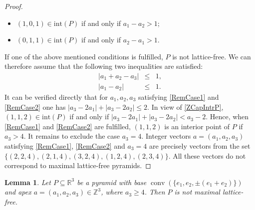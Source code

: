 \documentclass[a4paper]{article}
\theoremstyle{plain}
\newtheorem{lemma}[nn]{Lemma}
\begin{document}
\begin{proof}
\begin{itemize}
  \item $(1,0,1) \in {\mathrm{int}}(P)$ if and only if $a_1 - a_2 > 1$;
  \item $(0,1,1) \in {\mathrm{int}}(P)$ if and only if $a_2 - a_1 > 1.$ 
\end{itemize} 
If one of the above mentioned conditions is fulfilled, $P$
is not lattice-free.
We can therefore assume that the following two inequalities
are satisfied:
\begin{eqnarray}
  |a_1 + a_2 - a_3| & \le & 1, \label{RemCase1} \\
  |a_1 - a_2|       & \le & 1. \label{RemCase2}
\end{eqnarray}
It can be verified directly that for $a_1,a_2,a_3$
satisfying \eqref{RemCase1} and \eqref{RemCase2} one has
$|a_3 - 2a_1| + |a_3 - 2a_2| \le 2$.
In view of \eqref{ZCapIntrP}, $(1,1,2) \in {\mathrm{int}}(P)$ if and
only if $|a_3 - 2 a_1|+|a_3 - 2 a_2| < a_3-2$.
Hence, when \eqref{RemCase1} and \eqref{RemCase2} are
fulfilled, $(1,1,2)$ is an interior point of $P$ if $a_3 >
4$.
It remains to exclude the case $a_3 = 4$.
Integer vectors $a = (a_1,a_2,a_3)$ satisfying
\eqref{RemCase1}, \eqref{RemCase2} and $a_3=4$ are precisely
vectors from the set
$\{(2,2,4),(2,1,4),(3,2,4),(1,2,4),(2,3,4)\}$.
All these vectors do not correspond to maximal lattice-free
pyramids.
\end{proof}

\begin{lemma} \label{ArrowBasis}
Let $P \subseteq {\mathbb{R}}^3$ be a pyramid with base
${{\mathop{\mathrm{{conv}}}}}(\{ e_1, e_2, \pm (e_1 + e_2) \})$ and apex
$a = (a_1, a_2, a_3) \in {\mathbb{Z}}^3$, where $a_3 \geq 4$.
Then $P$ is not maximal lattice-free.
\end{lemma}
\end{document}
